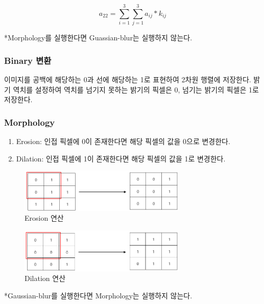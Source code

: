 \documentclass[conference]{IEEEtran}
\begin{document}
\vspace{-1em}
$$ a_{22} = \sum_{i = 1}^{3} \sum_{j = 1}^{3} a_{ij} * k_{ij} $$

*Morphology를 실행한다면 Guassian-blur는 실행하지 않는다.

\subsubsection{Binary 변환}

이미지를 공백에 해당하는 0과 선에 해당하는 1로 표현하여 2차원 행렬에 저장한다.
밝기 역치를 설정하여 역치를 넘기지 못하는 밝기의 픽셀은 0, 넘기는 밝기의 픽셀은 1로 저장한다.

\subsubsection{Morphology}

\begin{enumerate}
    \item Erosion: 인접 픽셀에 0이 존재한다면 해당 픽셀의 값을 0으로 변경한다.
    \item Dilation: 인접 픽셀에 1이 존재한다면 해당 픽셀의 값을 1로 변경한다.
\end{enumerate}

\vspace{-1em}

\begin{figure}[H]
    \centering
    \includegraphics[width=8cm]{Erosion.png}
    \caption{Erosion 연산}
\end{figure}

\vspace{-1.5em}

\begin{figure}[H]
    \centering
    \includegraphics[width=8cm]{Dilation.png}
    \caption{Dilation 연산}
\end{figure}

*Gaussian-blur를 실행한다면 Morphology는 실행하지 않는다.
\end{document}
